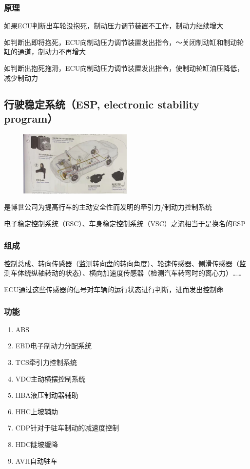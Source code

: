 	\subsubsection{原理}
		如果ECU判断出车轮没抱死，制动压力调节装置不工作，制动力继续增大
		
		如判断出即将抱死，ECU向制动压力调节装置发出指令，～关闭制动缸和制动轮缸的通道，制动力不再增大
		
		如判断出抱死拖滑，ECU向制动压力调节装置发出指令，使制动轮缸油压降低，减少制动力
\subsection{行驶稳定系统（ESP, electronic stability program）}
	\begin{figure}[htbp]
		\centering
		\includegraphics[width=0.5\textwidth]{5-5}
	\end{figure}
	是博世公司为提高行车的主动安全性而发明的牵引力/制动力控制系统
	
	电子稳定控制系统（ESC）、车身稳定控制系统（VSC）之流相当于是换名的ESP
	\subsubsection{组成}
		控制总成、转向传感器（监测转向盘的转向角度）、轮速传感器、侧滑传感器（监测车体绕纵轴转动的状态）、横向加速度传感器（检测汽车转弯时的离心力）……
		
		ECU通过这些传感器的信号对车辆的运行状态进行判断，进而发出控制命
	\subsubsection{功能}
		\begin{enumerate}
			\item  ABS
			\item  EBD电子制动力分配系统
			\item  TCS牵引力控制系统
			\item  VDC主动横摆控制系统
			\item  HBA液压制动器辅助
			\item  HHC上坡辅助
			\item  CDP针对于驻车制动的减速度控制
			\item  HDC陡坡缓降
			\item  AVH自动驻车
		\end{enumerate}
	
